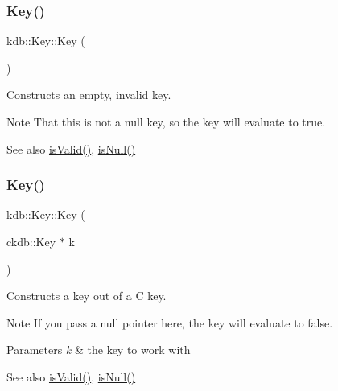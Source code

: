 \subsubsection{\texorpdfstring{Key()}{Key()}\hspace{0.1cm}{\footnotesize\ttfamily [1/7]}}
{\footnotesize\ttfamily kdb\+::\+Key\+::\+Key (\begin{DoxyParamCaption}{ }\end{DoxyParamCaption})\hspace{0.3cm}{\ttfamily [inline]}}



Constructs an empty, invalid key. 

\begin{DoxyNote}{Note}
That this is not a null key, so the key will evaluate to true.
\end{DoxyNote}
\begin{DoxySeeAlso}{See also}
\mbox{\hyperlink{classkdb_1_1Key_a69e621790e5717c56f7275e0b8d5e27c}{is\+Valid()}}, \mbox{\hyperlink{classkdb_1_1Key_ab70b89caae5fe1e9a2e774733576fa4c}{is\+Null()}} 
\end{DoxySeeAlso}
\mbox{\label{classkdb_1_1Key_a41ada34fa45a270e63444267621b59c9}} 
\subsubsection{\texorpdfstring{Key()}{Key()}\hspace{0.1cm}{\footnotesize\ttfamily [2/7]}}
{\footnotesize\ttfamily kdb\+::\+Key\+::\+Key (\begin{DoxyParamCaption}\item[{ckdb\+::\+Key $\ast$}]{k }\end{DoxyParamCaption})\hspace{0.3cm}{\ttfamily [inline]}}



Constructs a key out of a C key. 

\begin{DoxyNote}{Note}
If you pass a null pointer here, the key will evaluate to false.
\end{DoxyNote}

\begin{DoxyParams}{Parameters}
{\em k} & the key to work with\\
\hline
\end{DoxyParams}
\begin{DoxySeeAlso}{See also}
\mbox{\hyperlink{classkdb_1_1Key_a69e621790e5717c56f7275e0b8d5e27c}{is\+Valid()}}, \mbox{\hyperlink{classkdb_1_1Key_ab70b89caae5fe1e9a2e774733576fa4c}{is\+Null()}} 
\end{DoxySeeAlso}
\mbox{\label{classkdb_1_1Key_a33f63e153a7d832a54e02c0cba569feb}} 

